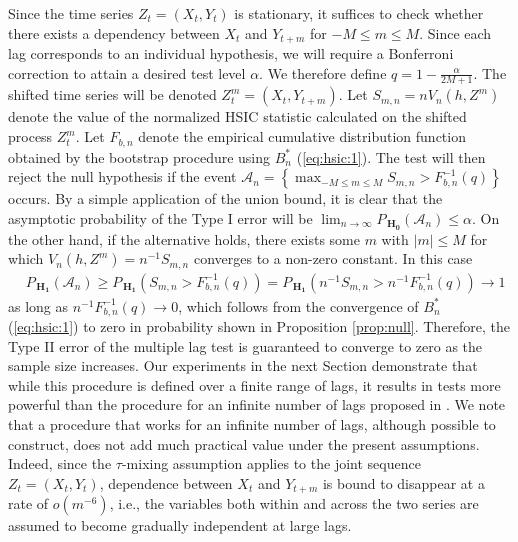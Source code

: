 Since the time series $Z_t=(X_t,Y_t)$ is stationary, it suffices to check whether there exists a dependency between $X_t$ and $Y_{t+m}$ for $-M \leq m \leq M$. Since each lag corresponds to an individual hypothesis, we will require a Bonferroni correction to attain a desired test level $\alpha$. We therefore define $q = 1-\frac{\alpha}{2M+1}$. The shifted time series will be denoted $Z_t^m =(X_t,Y_{t+m})$. Let $S_{m,n}=n V_n(h,Z^m)$ denote the value of the normalized HSIC statistic calculated on the shifted process $Z_t^m$. Let $F_{b,n}$ denote the empirical cumulative distribution function obtained by the bootstrap procedure using $B_n^*$ (\ref{eq:hsic:1}). The test will then reject the null hypothesis if the event $\mathcal A_n = \left\{ \max_{-M \leq m \leq M} S_{m,n} > F^{-1}_{b,n}(q) \right\}$ occurs. By a simple application of the union bound, it is clear that the asymptotic probability of the Type I error will be $\lim_{n\to\infty}P_{\,\mathbf{H_0}}\left(\mathcal A_n\right)\leq\alpha$. On the other hand, if the alternative holds, there exists some $m$ with $|m|\leq M$ for which $V_n(h,Z^m)=n^{-1} S_{m,n}$ converges to a non-zero constant. In this case  
\begin{align}
\label{eg:aletrnative1}
&P_{\,\mathbf{H_1}}(\mathcal A_n)  \geq  P_{\,\mathbf{H_1}}( S_{m,n} > F^{-1}_{b,n}(q)) = P_{\,\mathbf{H_1}}( n^{-1} S_{m,n} > n^{-1} F^{-1}_{b,n}(q) ) \to 1
\end{align}
as long as $n^{-1} F^{-1}_{b,n}(q)\to 0$, which follows from the convergence of $B_n^*$ (\ref{eq:hsic:1}) to zero in probability shown in Proposition \ref{prop:null}. Therefore, the Type II error of the multiple lag test is guaranteed to converge to zero as the sample size increases.
Our experiments in the next Section demonstrate that while this procedure is defined over a finite range of lags, it results in tests  more powerful than the procedure for an infinite number of lags proposed in \cite{besserve_statistical_2013}. 
We note that a procedure that works for an infinite number of lags, although possible to construct, does not add much practical value under the present assumptions. Indeed,  since the $\tau$-mixing assumption applies to the joint sequence $Z_t=(X_t,Y_t)$, dependence between $X_t$ and $Y_{t+m}$ is bound to disappear at a rate of $o(m^{-6})$, i.e., the variables both within and across the two series are assumed to become gradually independent at large lags.     




